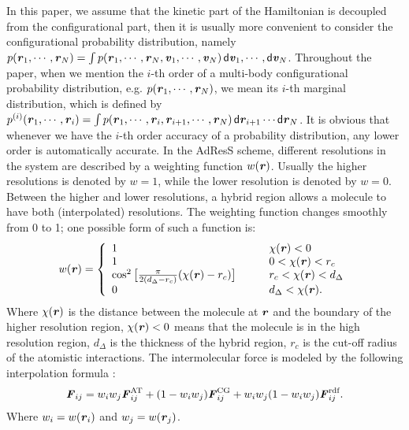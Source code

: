 \documentclass[aip,jcp,a4paper,reprint,onecolumn]{revtex4-1}
\newcommand{\vect}[1]{\textbf{\textit{#1}}}
\newcommand{\dd}[1]{\textsf{#1}}
\newcommand{\AT}{{\textrm{{AT}}}}
\newcommand{\CG}{{\textrm{CG}}}
\newcommand{\HY}{{\Delta}}
\newcommand{\rdf}{{\textrm{rdf}}}
\begin{document}
  In this paper, we assume that
  the kinetic part of the Hamiltonian is decoupled from the configurational part, then
  it is usually more convenient to consider the configurational
  probability distribution, namely $ p(\vect r_1,\cdots,\vect r_N) =
  \int p(\vect r_1,\cdots,\vect r_N, \vect v_1,\cdots,\vect v_N)\,\dd d\vect v_1,\cdots,\dd d\vect v_N$.
Throughout the paper, when we mention the $i$-th order of a
  multi-body configurational probability distribution, e.g.
  $p(\vect r_1, \cdots, \vect r_N)$, we mean its $i$-th marginal
  distribution, which is defined by
  $p^{(i)}(\vect r_1, \cdots, \vect r_i)
  = \int p(\vect r_1, \cdots, \vect r_i, \vect r_{i+1}, \cdots, \vect r_N)\,
  \dd d \vect r_{i+1}\cdots\dd d \vect r_N$.
  It is obvious that
  whenever we have the $i$-th order accuracy of a probability distribution,
  any lower  order is automatically accurate.
In the AdResS scheme,
different resolutions in the system are described by a weighting
function $w(\vect r)$. Usually the higher resolutions is
denoted by $w = 1$, while the lower resolution is denoted by $w = 0$.
Between the higher and lower resolutions, a hybrid region allows a 
molecule to have both (interpolated) resolutions. The weighting function changes smoothly
from 0 to 1; one possible form of such a function is:
\begin{align}\label{eqn:new-w}
  w(\vect r) =
  \left\{
    \begin{array}{lcl}
      1 &\quad& \chi(\vect r) < 0\\
      1  && 0 < \chi(\vect r) < r_c\\
      \cos^2\big[\frac{\pi}{2(d_{\HY} - r_c)} (\chi(\vect r) - r_c)\big] && r_c < \chi(\vect r) < d_{\HY} \\
      0 &&  d_{\HY}  < \chi(\vect r).
    \end{array}
  \right.
\end{align}
Where $\chi(\vect r)$ is the distance between the
molecule at $\vect r$ and the boundary of the higher resolution
region, $\chi(\vect r) < 0$ means that the molecule is in the high resolution
region, $d_{\HY}$ is the thickness of the hybrid region, $r_c$ is the
cut-off radius of the atomistic interactions.  The intermolecular force is modeled by the following
interpolation formula \cite{rdfcorr}:
\begin{align}
  \vect F_{ij} =
  w_i w_j\vect F^{\AT}_{ij} +
  (1-w_i w_j)\vect F^{\CG}_{i j} +
  w_i w_j (1-w_i w_j)\vect F_{ij}^{\rdf}.
\label{grf}
\end{align}
Where $w_i = w(\vect r_i)$ and $w_j = w(\vect r_j)$.
\end{document}
